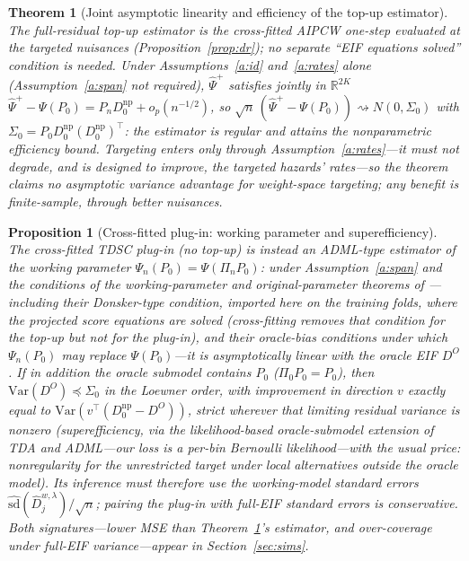 \documentclass[11pt]{article}
\newtheorem{theorem}{Theorem}
\newtheorem{proposition}{Proposition}
\theoremstyle{remark}
\newcommand{\Pn}{P_n}
\begin{document}
\begin{theorem}[Joint asymptotic linearity and efficiency of the top-up estimator]\label{thm:main}
The full-residual top-up estimator \emph{is} the cross-fitted AIPCW one-step evaluated at the targeted nuisances (Proposition~\ref{prop:dr}); no separate ``EIF equations solved'' condition is needed. Under Assumptions~\ref{a:id} and~\ref{a:rates} alone (Assumption~\ref{a:span} not required), $\widehat\Psi^{+}$ satisfies jointly in $\mathbb{R}^{2K}$
$\widehat\Psi^{+} - \Psi(P_0) = \Pn D^{\mathrm{np}}_{0} + o_p(n^{-1/2})$, so $\sqrt n\,(\widehat\Psi^{+} - \Psi(P_0)) \rightsquigarrow N(0, \Sigma_0)$ with $\Sigma_0 = P_0 D^{\mathrm{np}}_0 (D^{\mathrm{np}}_0)^\top$: the estimator is regular and attains the nonparametric efficiency bound. Targeting enters only through Assumption~\ref{a:rates}---it must not degrade, and is designed to improve, the targeted hazards' rates---so the theorem claims no asymptotic variance advantage for weight-space targeting; any benefit is finite-sample, through better nuisances.
\end{theorem}

\begin{proposition}[Cross-fitted plug-in: working parameter and superefficiency]\label{prop:plugin}
The cross-fitted TDSC \emph{plug-in} (no top-up) is instead an ADML-type estimator of the working parameter $\Psi_n(P_0) = \Psi(\Pi_n P_0)$: under Assumption~\ref{a:span} and the conditions of the working-parameter and original-parameter theorems of \citet{li2025tda}---including their Donsker-type condition, imported here \emph{on the training folds}, where the projected score equations are solved (cross-fitting removes that condition for the top-up but not for the plug-in), and their oracle-bias conditions under which $\Psi_n(P_0)$ may replace $\Psi(P_0)$---it is asymptotically linear with the oracle EIF $D^{O}$. If in addition the oracle submodel contains $P_0$ ($\Pi_0 P_0 = P_0$), then $\mathrm{Var}(D^{O}) \preceq \Sigma_0$ in the Loewner order, with improvement in direction $v$ exactly equal to $\mathrm{Var}(v^\top(D^{\mathrm{np}}_0 - D^{O}))$, strict wherever that limiting residual variance is nonzero (superefficiency, via the likelihood-based oracle-submodel extension of TDA and ADML---our loss is a per-bin Bernoulli likelihood---with the usual price: nonregularity for the unrestricted target under local alternatives outside the oracle model). Its inference must therefore use the \emph{working-model} standard errors $\widehat{\mathrm{sd}}(\widehat D^{w,\lambda}_j)/\sqrt n$; pairing the plug-in with full-EIF standard errors is conservative. Both signatures---lower MSE than Theorem~\ref{thm:main}'s estimator, and over-coverage under full-EIF variance---appear in Section~\ref{sec:sims}.
\end{proposition}
\end{document}
